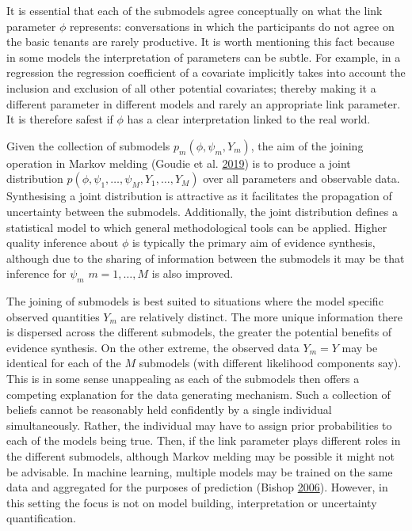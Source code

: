 \documentclass[11pt,]{book}
\begin{document}
It is essential that each of the submodels agree conceptually on what
the link parameter \(\phi\) represents: conversations in which the
participants do not agree on the basic tenants are rarely productive. It
is worth mentioning this fact because in some models the interpretation
of parameters can be subtle. For example, in a regression the regression
coefficient of a covariate implicitly takes into account the inclusion
and exclusion of all other potential covariates; thereby making it a
different parameter in different models and rarely an appropriate link
parameter. It is therefore safest if \(\phi\) has a clear interpretation
linked to the real world.

Given the collection of submodels \(p_m(\phi, \psi_m, Y_m)\), the aim of
the joining operation in Markov melding (Goudie et al.
\protect\hyperlink{ref-goudie2019joining}{2019}) is to produce a joint
distribution \(p(\phi, \psi_1, \ldots, \psi_M, Y_1, \ldots, Y_M)\) over
all parameters and observable data. Synthesising a joint distribution is
attractive as it facilitates the propagation of uncertainty between the
submodels. Additionally, the joint distribution defines a statistical
model to which general methodological tools can be applied. Higher
quality inference about \(\phi\) is typically the primary aim of
evidence synthesis, although due to the sharing of information between
the submodels it may be that inference for \(\psi_m\)
\(m = 1, \ldots, M\) is also improved.

The joining of submodels is best suited to situations where the model
specific observed quantities \(Y_m\) are relatively distinct. The more
unique information there is dispersed across the different submodels,
the greater the potential benefits of evidence synthesis. On the other
extreme, the observed data \(Y_m = Y\) may be identical for each of the
\(M\) submodels (with different likelihood components say). This is in
some sense unappealing as each of the submodels then offers a competing
explanation for the data generating mechanism. Such a collection of
beliefs cannot be reasonably held confidently by a single individual
simultaneously. Rather, the individual may have to assign prior
probabilities to each of the models being true. Then, if the link
parameter plays different roles in the different submodels, although
Markov melding may be possible it might not be advisable. In machine
learning, multiple models may be trained on the same data and aggregated
for the purposes of prediction (Bishop
\protect\hyperlink{ref-bishop2006pattern}{2006}). However, in this
setting the focus is not on model building, interpretation or
uncertainty quantification.
\end{document}
